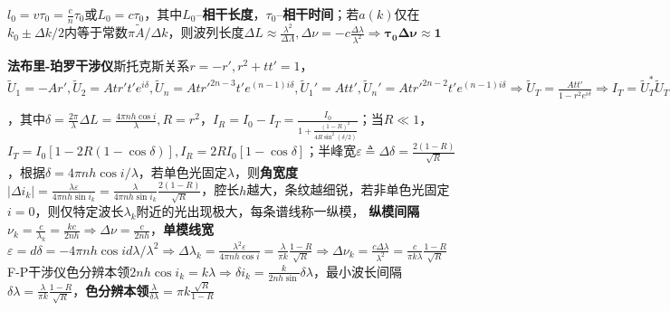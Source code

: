 \documentclass[10pt,a4paper]{article}
\begin{document}
$l_0=v\tau_0=\frac{c}{n}\tau_0$或$L_0=c\tau_0$，其中$L_0$--\textbf{相干长度}，$\tau_0$--\textbf{相干时间}；若$a(k)$仅在$k_0\pm\Delta k/2$内等于常数$\pi\widetilde{A}/\Delta k$，则波列长度$\Delta L\approx\frac{\lambda^2}{\Delta\Lambda},\Delta\nu=-c\frac{\Delta\lambda}{\lambda^2}\Longrightarrow\bm{\tau_0\Delta\nu\approx1}$

\textbf{法布里-珀罗干涉仪}斯托克斯关系$r=-r',r^2+tt'=1$，$\widetilde{U}_1=-Ar',\widetilde{U}_2=Atr't'e^{i\delta},\widetilde{U}_n=Atr'^{2n-3}t'e^{(n-1)i\delta},\widetilde{U}_1'=Att',\widetilde{U}_n'=Atr'^{2n-2}t'e^{(n-1)i\delta}\Longrightarrow \widetilde{U}_T=\frac{Att'}{1-r^2e^{i\delta}}\Longrightarrow I_T=\widetilde{U}_T^*\widetilde{U}_T=\frac{I_0(1-r^2)^2}{1-2r^2\cos\delta+r^4}=\frac{I_0}{1+\frac{4R\sin^2(\delta/2)}{(1-R)^2}}$，其中$\delta=\frac{2\pi}{\lambda}\Delta L=\frac{4\pi nh\cos i}{\lambda},R=r^2$，$I_R=I_0-I_T=\frac{I_0}{1+\frac{(1-R)^2}{4R\sin^2(\delta/2)}}$；当$R\ll1$，$I_T=I_0[1-2R(1-\cos\delta)],I_R=2RI_0[1-\cos\delta]$；半峰宽$\varepsilon\triangleq\Delta\delta=\frac{2(1-R)}{\sqrt{R}}$，根据$\delta=4\pi nh\cos i/\lambda$，若单色光固定$\lambda$，则\textbf{角宽度}$|\Delta i_k|=\frac{\lambda\varepsilon}{4\pi nh\sin i_k}=\frac{\lambda}{4\pi nh\sin i_k}\frac{2(1-R)}{\sqrt{R}}$，腔长$h$越大，条纹越细锐，若非单色光固定$i=0$，则仅特定波长$\lambda_k$附近的光出现极大，每条谱线称一纵模，
\textbf{纵模间隔}$\nu_k=\frac{c}{\lambda_k}=\frac{kc}{2nh}\Longrightarrow\Delta\nu=\frac{c}{2nh}$，\textbf{单模线宽}$\varepsilon=d\delta=-4\pi nh\cos id\lambda/\lambda^2\Longrightarrow\Delta\lambda_k=\frac{\lambda^2\varepsilon}{4\pi nh\cos i}=\frac{\lambda}{\pi k}\frac{1-R}{\sqrt{R}}\Longrightarrow\Delta\nu_k=\frac{c\Delta\lambda}{\lambda^2}=\frac{c}{\pi k\lambda}\frac{1-R}{\sqrt{R}}$
F-P干涉仪色分辨本领$2nh\cos i_k=k\lambda\Longrightarrow\delta i_k=\frac{k}{2nh\sin}\delta\lambda$，最小波长间隔$\delta\lambda=\frac{\lambda}{\pi k}\frac{1-R}{\sqrt{R}}$，\textbf{色分辨本领}$\frac{\lambda}{\delta\lambda}=\pi k\frac{\sqrt{R}}{1-R}$
\end{document}
